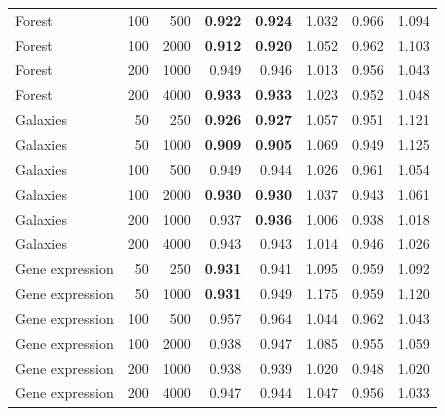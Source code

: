 \begin{tabular}{lrrrrrrr}
Forest & 100 & 500 & \textbf{0.922} & \textbf{0.924} & 1.032 & 0.966 & 1.094 \\
Forest & 100 & 2000 & \textbf{0.912} & \textbf{0.920} & 1.052 & 0.962 & 1.103 \\
Forest & 200 & 1000 & 0.949 & 0.946 & 1.013 & 0.956 & 1.043 \\
Forest & 200 & 4000 & \textbf{0.933} & \textbf{0.933} & 1.023 & 0.952 & 1.048 \\
Galaxies & 50 & 250 & \textbf{0.926} & \textbf{0.927} & 1.057 & 0.951 & 1.121 \\
Galaxies & 50 & 1000 & \textbf{0.909} & \textbf{0.905} & 1.069 & 0.949 & 1.125 \\
Galaxies & 100 & 500 & 0.949 & 0.944 & 1.026 & 0.961 & 1.054 \\
Galaxies & 100 & 2000 & \textbf{0.930} & \textbf{0.930} & 1.037 & 0.943 & 1.061 \\
Galaxies & 200 & 1000 & 0.937 & \textbf{0.936} & 1.006 & 0.938 & 1.018 \\
Galaxies & 200 & 4000 & 0.943 & 0.943 & 1.014 & 0.946 & 1.026 \\
Gene expression & 50 & 250 & \textbf{0.931} & 0.941 & 1.095 & 0.959 & 1.092 \\
Gene expression & 50 & 1000 & \textbf{0.931} & 0.949 & 1.175 & 0.959 & 1.120 \\
Gene expression & 100 & 500 & 0.957 & 0.964 & 1.044 & 0.962 & 1.043 \\
Gene expression & 100 & 2000 & 0.938 & 0.947 & 1.085 & 0.955 & 1.059 \\
Gene expression & 200 & 1000 & 0.938 & 0.939 & 1.020 & 0.948 & 1.020 \\
Gene expression & 200 & 4000 & 0.947 & 0.944 & 1.047 & 0.956 & 1.033 \\
\bottomrule
\end{tabular}
